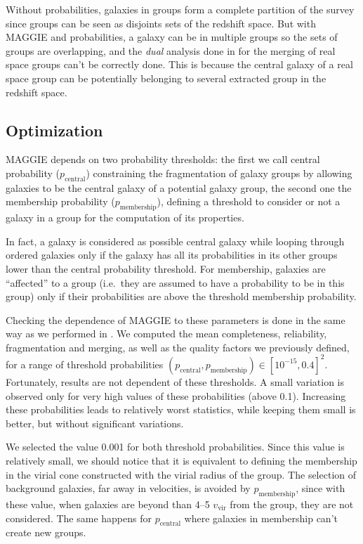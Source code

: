 Without probabilities, galaxies in groups form a complete partition of the
survey since groups can be seen as disjoints sets of the redshift space. But
with MAGGIE and probabilities, a galaxy can be in multiple groups so the
sets of groups are overlapping, and the \emph{dual} analysis done in
\citet{Duarte+14} for the merging of real space groups can't be correctly done.
This is because the central galaxy of a real space group can be potentially
belonging to several extracted group in the redshift space.

\subsection{Optimization}

MAGGIE depends on two probability thresholds: the first we call central
probability ($p_\mathrm{central}$) constraining the fragmentation of galaxy
groups by allowing galaxies to be the central galaxy of a potential galaxy
group, the second one the membership probability ($p_\mathrm{membership}$),
defining a threshold to consider or not a galaxy in a group for the computation
of its properties.

In fact, a galaxy is considered as possible central galaxy while looping
through ordered galaxies only if the galaxy has all its probabilities in its
other groups lower than the central probability threshold. For membership,
galaxies are ``affected'' to a group (i.e.\ they are assumed to have a
probability to be in this group) only if their probabilities are above the
threshold membership probability.

Checking the dependence of MAGGIE to these parameters is done in the same way
as we performed in . We computed
the mean completeness, reliability, fragmentation and merging, as well as the
quality factors we previously defined, for a range of threshold probabilities
$(p_\mathrm{central}, p_\mathrm{membership})\in{\left[10^{-15}, 0.4\right]}^2$.
Fortunately, results are not dependent of these thresholds. A small variation
is observed only for very high values of these probabilities (above 0.1).
Increasing these probabilities leads to relatively worst statistics, while
keeping them small is better, but without significant variations.

We selected the value 0.001 for both threshold probabilities. Since this value
is relatively small, we should notice that it is equivalent to defining the
membership in the virial cone constructed with the virial radius of the group.
The selection of background galaxies, far away in velocities, is avoided by
$p_\mathrm{membership}$, since with these value, when galaxies are beyond than
4--5 $v_\mathrm{vir}$ from the group, they are not considered. The same happens
for $p_\mathrm{central}$ where galaxies in membership can't create new groups.

